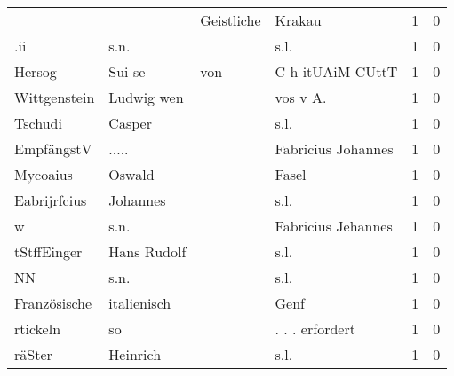 \begin{tabular}{llllrr}
                          &                                    &  Geistliche &                                      Krakau &          1 &         0 \\
                      .ii &                               s.n. &             &                                        s.l. &          1 &         0 \\
                   Hersog &                             Sui se &         von &                            C h itUAiM CUttT &          1 &         0 \\
             Wittgenstein &                         Ludwig wen &             &                                   vos v A.  &          1 &         0 \\
                  Tschudi &                             Casper &             &                                        s.l. &          1 &         0 \\
               EmpfängstV &                              ..... &             &                          Fabricius Johannes &          1 &         0 \\
                 Mycoaius &                             Oswald &             &                                       Fasel &          1 &         0 \\
             Eabrijrfcius &                           Johannes &             &                                        s.l. &          1 &         0 \\
                        w &                               s.n. &             &                          Fabricius Jehannes &          1 &         0 \\
              tStffEinger &                        Hans Rudolf &             &                                        s.l. &          1 &         0 \\
                       NN &                               s.n. &             &                                        s.l. &          1 &         0 \\
             Französische &                        italienisch &             &                                        Genf &          1 &         0 \\
                 rtickeln &                                 so &             &                             . . . erfordert &          1 &         0 \\
                   räSter &                           Heinrich &             &                                        s.l. &          1 &         0 \\

\end{tabular}
